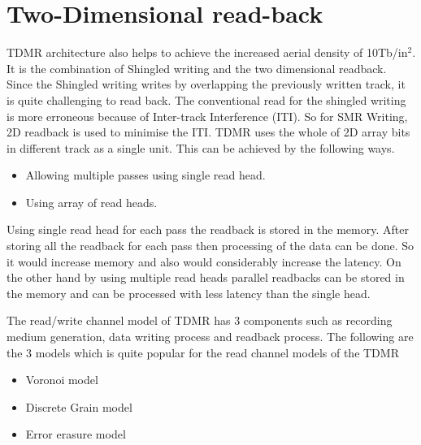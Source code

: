 \section{Two-Dimensional read-back}
TDMR architecture also helps to achieve the increased aerial density of 10Tb/in$^2$. It is the combination of Shingled writing and the two dimensional readback.~\cite{IEEE_HITACHI} Since the Shingled writing writes by overlapping the previously written track, it is quite challenging to read back. The conventional read for the shingled writing is more erroneous because of Inter-track Interference (ITI). So for SMR Writing, 2D readback is used to minimise the ITI. TDMR uses the whole of 2D array bits in different track as a single unit. This can be achieved by the following ways.
\begin{itemize}
	\item Allowing multiple passes using single read head.
	\item Using array of read heads.
\end{itemize}

Using single read head for each pass the readback is stored in the memory. After storing all the readback for each pass then processing of the data can be done. So it would increase memory and also would considerably increase the latency. On the other hand by using multiple read heads parallel readbacks can be stored in the memory and can be processed with less latency than the single head.~\cite{Elidrissi}

The read/write channel model of TDMR has 3 components such as recording medium generation, data writing process and readback process. The following are the 3 models which is quite popular for the read channel models of the TDMR~\cite{Krishnan}\cite{Vasic}
\begin{itemize}
	\item Voronoi model
	\item Discrete Grain model
	\item Error erasure model
\end{itemize}

